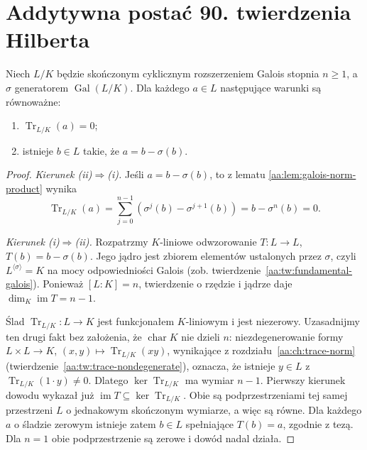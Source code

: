 \section{Addytywna postać 90. twierdzenia Hilberta}
\begin{twierdzenie}\label{aa:tw:hilbert90-additive}
Niech $L/K$ będzie skończonym cyklicznym rozszerzeniem Galois
stopnia $n\geq1$, a $\sigma$ generatorem $\operatorname{Gal}(L/K)$.
Dla każdego $a\in L$ następujące warunki są równoważne:
\begin{enumerate}[label=\textup{(\roman*)}]
\item $\operatorname{Tr}_{L/K}(a)=0$;
\item istnieje $b\in L$ takie, że $a=b-\sigma(b)$.
\end{enumerate}
\end{twierdzenie}
\begin{proof}
\emph{Kierunek (ii)$\Rightarrow$(i).}
Jeśli $a=b-\sigma(b)$, to z lematu
\ref{aa:lem:galois-norm-product} wynika
\[
\operatorname{Tr}_{L/K}(a)
=\sum_{j=0}^{n-1}(\sigma^j(b)-\sigma^{j+1}(b))
=b-\sigma^n(b)=0.
\]

\emph{Kierunek (i)$\Rightarrow$(ii).}
Rozpatrzmy $K$-liniowe odwzorowanie
$T:L\to L$, $T(b)=b-\sigma(b)$.
Jego jądro jest zbiorem elementów ustalonych przez $\sigma$,
czyli $L^{\langle\sigma\rangle}=K$ na mocy odpowiedniości Galois
(zob. twierdzenie~\ref{aa:tw:fundamental-galois}).
Ponieważ $[L:K]=n$, twierdzenie o rzędzie i jądrze daje
$\dim_K\operatorname{im}T=n-1$.

Ślad $\operatorname{Tr}_{L/K}:L\to K$ jest funkcjonałem
$K$-liniowym i jest niezerowy. Uzasadnijmy ten drugi fakt bez
założenia, że $\operatorname{char}K$ nie dzieli $n$:
niezdegenerowanie formy $L\times L\to K$,
$(x,y)\mapsto\operatorname{Tr}_{L/K}(xy)$,
wynikające z rozdziału~\ref{aa:ch:trace-norm}
(twierdzenie~\ref{aa:tw:trace-nondegenerate}), oznacza, że
istnieje $y\in L$ z $\operatorname{Tr}_{L/K}(1\cdot y)\neq0$.
Dlatego $\ker\operatorname{Tr}_{L/K}$ ma wymiar $n-1$.
Pierwszy kierunek dowodu wykazał już
$\operatorname{im}T\subseteq\ker\operatorname{Tr}_{L/K}$.
Obie są podprzestrzeniami tej samej przestrzeni $L$
o jednakowym skończonym wymiarze, a więc są równe.
Dla każdego $a$ o śladzie zerowym istnieje zatem $b\in L$
spełniające $T(b)=a$, zgodnie z tezą.
Dla $n=1$ obie podprzestrzenie są zerowe i dowód nadal działa.
\end{proof}

